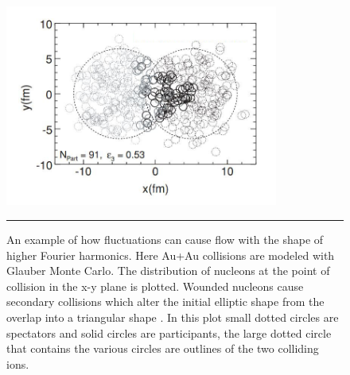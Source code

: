 \begin{figure}[htbp!]
  \centering
    \includegraphics[width=0.8\textwidth]{prevplots/phobosglauberv3.JPG}
    \rule{35em}{0.5pt}
  \caption[Triangular Flow from Fluctuations.]{An example of how fluctuations can cause flow with the shape of higher Fourier harmonics. Here Au+Au collisions are modeled with Glauber Monte Carlo. The distribution of nucleons at the point of collision in the x-y plane is plotted. Wounded nucleons cause secondary collisions which alter the initial elliptic shape from the overlap into a triangular shape \citep{Alver:2010gr}. In this plot small dotted circles are spectators and solid circles are participants, the large dotted circle that contains the various circles are outlines of the two colliding ions.}
  \label{fig:v3inauau}
\end{figure}
\pagebreak
\pagebreak
